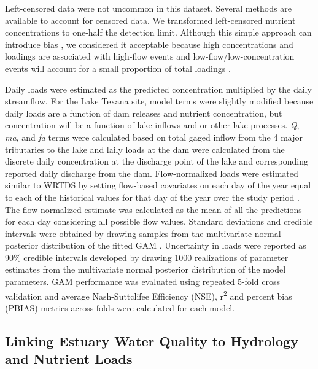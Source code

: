 \documentclass[water,article,submit,oneauthor]{Definitions/mdpi}
\begin{document}
Left-censored data were not uncommon in this dataset. Several methods
are available to account for censored data. We transformed left-censored
nutrient concentrations to one-half the detection limit. Although this
simple approach can introduce bias
\citep{hornungEstimationAverageConcentration1990}, we considered it
acceptable because high concentrations and loadings are associated with
high-flow events and low-flow/low-concentration events will account for
a small proportion of total loadings \citep{mcdowell_implications_2021}.

Daily loads were estimated as the predicted concentration multiplied by
the daily streamflow. For the Lake Texana site, model terms were
slightly modified because daily loads are a function of dam releases and
nutrient concentration, but concentration will be a function of lake
inflows and or other lake processes. \emph{Q}, \emph{ma}, and \emph{fa}
terms were calculated based on total gaged inflow from the 4 major
tributaries to the lake and laily loads at the dam were calculated from
the discrete daily concentration at the discharge point of the lake and
corresponding reported daily discharge from the dam. Flow-normalized
loads were estimated similar to WRTDS by setting flow-based covariates
on each day of the year equal to each of the historical values for that
day of the year over the study period \citep{hirsch_weighted_2010}. The
flow-normalized estimate was calculated as the mean of all the
predictions for each day considering all possible flow values. Standard
deviations and credible intervals were obtained by drawing samples from
the multivariate normal posterior distribution of the fitted GAM
\citep{woodConfidenceIntervalsGeneralized2006, marraCoveragePropertiesConfidence2012, mcdowell_implications_2021}.
Uncertainty in loads were reported as 90\% credible intervals developed
by drawing 1000 realizations of parameter estimates from the
multivariate normal posterior distribution of the model parameters. GAM
performance was evaluated using repeated 5-fold cross validation
\citep{burmanComparativeStudyOrdinary1989} and average Nash-Suttclifee
Efficiency (NSE), r\textsuperscript{2} and percent bias (PBIAS) metrics
across folds were calculated for each model.

\hypertarget{linking-estuary-water-quality-to-hydrology-and-nutrient-loads}{%
\subsection{Linking Estuary Water Quality to Hydrology and Nutrient
Loads}\label{linking-estuary-water-quality-to-hydrology-and-nutrient-loads}}
\end{document}
